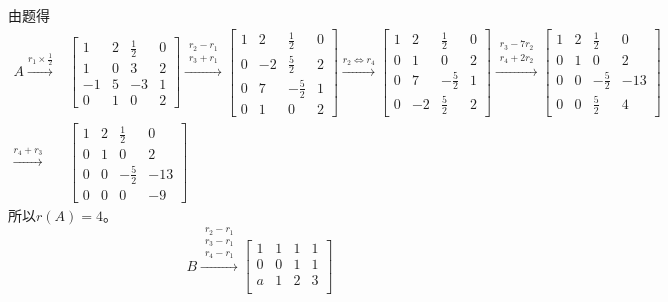 \documentclass{article}
\begin{document}
\begin{jie}
由题得
\begin{align*}
A\xrightarrow{r_{1}\times \frac{1}{2}}&
{
\begin{bmatrix}
   1 & 2 & \frac{1}{2} & 0\\
   1 & 0 & 3 & 2\\
   -1 & 5 & -3 & 1\\
   0 & 1 & 0 & 2
  \end{bmatrix}
}\xrightarrow{ \substack{r_{2}-r_{1} \\ r_{3}+r_{1}}}
{
\begin{bmatrix}
   1 & 2 & \frac{1}{2} & 0\\
   0 & -2 & \frac{5}{2} & 2\\
   0 & 7 & -\frac{5}{2} & 1\\
   0 & 1 & 0 & 2
  \end{bmatrix}
}\xrightarrow{r_{2}\Leftrightarrow r_{4}}
{
\begin{bmatrix}
   1 & 2 & \frac{1}{2} & 0\\
   0 & 1 & 0 & 2\\
   0 & 7 & -\frac{5}{2} & 1\\
   0 & -2 & \frac{5}{2} & 2
  \end{bmatrix}
}\xrightarrow{\substack{r_{3}-7 r_{2} \\ r_{4}+2r_{2}}}
{
\begin{bmatrix}
   1 & 2 & \frac{1}{2} & 0\\
   0 & 1 & 0 & 2\\
   0 & 0 & -\frac{5}{2} & -13\\
   0 & 0 & \frac{5}{2} & 4
  \end{bmatrix}
}\\
\xrightarrow{r_{4}+ r_{3}}&
{
\begin{bmatrix}
   1 & 2 & \frac{1}{2} & 0\\
   0 & 1 & 0 & 2\\
   0 & 0 & -\frac{5}{2} & -13\\
   0 & 0 & 0 & -9
  \end{bmatrix}
}
\end{align*}
所以$r(A)=4$。
\begin{equation*}
  B\xrightarrow{\substack{r_{2}- r_{1} \\ r_{3}- r_{1} \\ r_{4}- r_{1} }}
  {
  \begin{bmatrix}
   1& 1& 1 & 1\\
   0 & 0 & 1 & 1\\
   a & 1 & 2 & 3 \\

\end{bmatrix}}
\end{equation*}
\end{jie}
\end{document}

